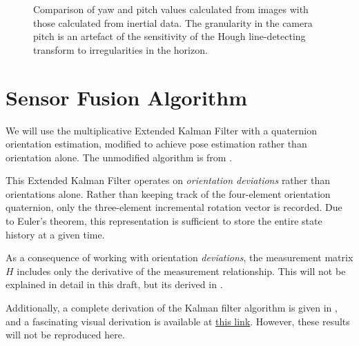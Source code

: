\documentclass{article}
\begin{document}
\begin{figure}[htbp]%
    \centering
    \caption{Comparison of yaw and pitch values calculated from images with those calculated from inertial data. The granularity in the camera pitch is an artefact of the sensitivity of the Hough line-detecting transform to irregularities in the horizon.}%
    \label{fig:attcompare}
\end{figure}

\section{Sensor Fusion Algorithm} \label{sec:algorithm}
We will use the multiplicative Extended Kalman Filter with a quaternion orientation estimation, modified to achieve pose estimation rather than orientation alone. The unmodified algorithm is from \cite{introtoiner}.

This Extended Kalman Filter operates on \textit{orientation deviations} rather than orientations alone. Rather than keeping track of the four-element orientation quaternion, only the three-element incremental rotation vector is recorded. Due to Euler's theorem, this representation is sufficient to store the entire state history at a given time. 

As a consequence of working with orientation \textit{deviations}, the measurement matrix $H$ includes only the derivative of the measurement relationship. This will not be explained in detail in this draft, but its derived in \cite{introtoiner}.

Additionally, a complete derivation of the Kalman filter algorithm is given in \cite{appliedkalman}, and a fascinating visual derivation is available at \hyperlink{https://www.bzarg.com/p/how-a-kalman-filter-works-in-pictures/}{this link}. However, these results will not be reproduced here.
\end{document}
